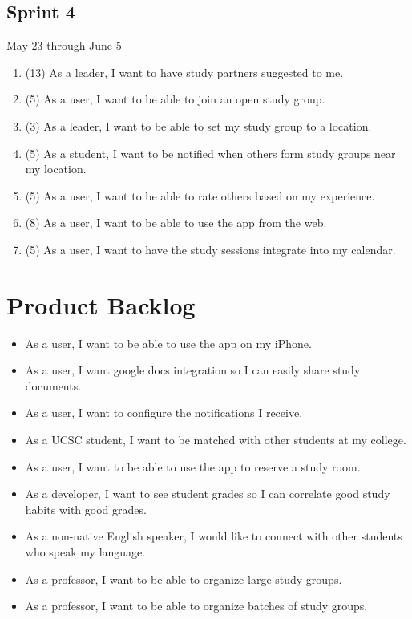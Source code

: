 \documentclass[10pt]{article}
\begin{document}
    \subsection{Sprint 4}
    May 23 through June 5
    \begin{enumerate}
        \item (13) As a leader, I want to have study partners suggested to me.
        \item (5) As a user, I want to be able to join an open study group.
        \item (3) As a leader, I want to be able to set my study group to a location.
        \item (5) As a student, I want to be notified when others form study groups near my location.
        \item (5) As a user, I want to be able to rate others based on my experience.
        \item (8) As a user, I want to be able to use the app from the web.
        \item (5) As a user, I want to have the study sessions integrate into my calendar.
    \end{enumerate}

    \section{Product Backlog}
    \begin{itemize}
        \item As a user, I want to be able to use the app on my iPhone.
        \item As a user, I want google docs integration so I can easily share study documents.
        \item As a user, I want to configure the notifications I receive.
        \item As a UCSC student, I want to be matched with other students at my college.
        \item As a user, I want to be able to use the app to reserve a study room.
        \item As a developer, I want to see student grades so I can correlate good study habits with good grades.
        \item As a non-native English speaker, I would like to connect with other students who speak my language.
        \item As a professor, I want to be able to organize large study groups.
        \item As a professor, I want to be able to organize batches of study groups.
    \end{itemize}
    
    
\end{document}
